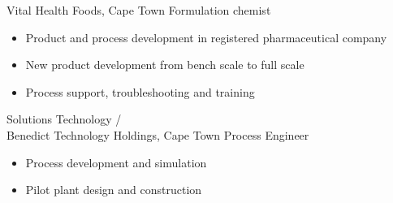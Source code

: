 \documentclass[%
               doublesided,
               paper=a4,
               fontsize=10pt
              ]{my-resume}
\begin{document}
{    
        {Vital Health Foods, Cape Town}
        {Formulation chemist}
        {\begin{itemize}
            \item Product and process development in registered pharmaceutical company
            \item New product development from bench scale to full scale
            \item Process support, troubleshooting and training
        \end{itemize}}

        {Solutions Technology /\\Benedict Technology Holdings, Cape Town}
        {Process Engineer}
        {\begin{itemize}
            \item Process development and simulation
            \item Pilot plant design and construction
        \end{itemize}}

}
\makebody
\clearpage
\end{document}
